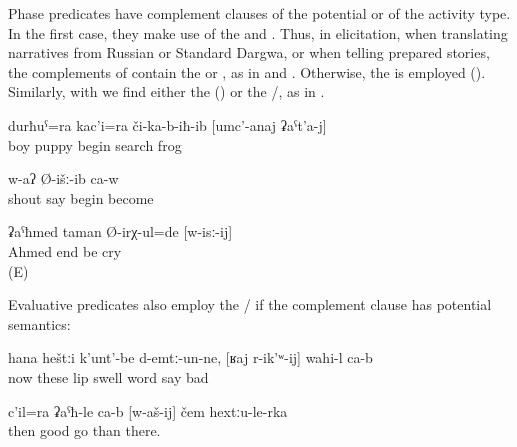 Phase predicates have complement clauses of the potential or of the activity type. In the first case, they make use of the  and . Thus, in elicitation, when translating narratives from Russian or Standard Dargwa, or when telling prepared stories, the complements of  contain the  or , as in  and . Otherwise, the  is employed (). Similarly, with  we find either the  () or the /, as in .
%
\begin{exe}
	\ex	\label{ex:‎The boy and the frog began to search for the frog}
	\gll	durħuˁ=ra	kac'i=ra	či-ka-b-iħ-ib	[umc'-anaj	ʡaˁt'a-j]\\
		boy	puppy	begin	search	frog\\
	\glt	{}

	\ex	\label{ex:He began to shout}
	\gll	[waˁw	Ø-ik'ʷ-ij]	w-aʔ	Ø-išː-ib	ca-w\\
		shout	say	\tsc{m-}begin	become	\\
	\glt	{}

	\ex	\label{ex:Ahmed stopped crying}
	\gll	ʡaˁħmed taman Ø-irχ-ul=de	[w-isː-ij]\\
		Ahmed end	be	cry\\
	\glt	{} (E)
\end{exe}

Evaluative predicates also employ the \slash {} if the complement clause has potential semantics:
%
\begin{exe}
	\ex	\label{ex:‎Now my lips are swollen, it is difficult to talk}
	\gll	hana	heštːi	k'unt'-be	d-emtː-un-ne,	[ʁaj	r-ik'ʷ-ij]	wahi-l	ca-b	\\
		now	these	lip	swell	word	say	bad	\\
	\glt	{}

	\ex	\label{ex:‎It is good (better) to go (on the ice-covered ground) than from there}
	\gll	c'il=ra	ʡaˁħ-le	ca-b	[w-aš-ij]	čem	hextːu-le-rka	\\
		then	good		go	than	there.\\
	\glt	{}
\end{exe}


